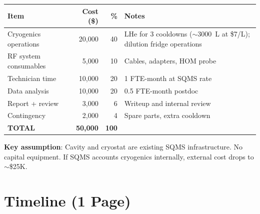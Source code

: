 \documentclass[11pt]{article}
\begin{document}
\begin{center}
\renewcommand{\arraystretch}{1.3}
\begin{tabular}{@{}lrrp{5.5cm}@{}}
\toprule
\textbf{Item} & \textbf{Cost (\$)} & \textbf{\%} &
\textbf{Notes} \\
\midrule
Cryogenics operations & 20,000 & 40 &
  LHe for 3 cooldowns ($\sim$3000~L at \$7/L);
  dilution fridge operations \\
RF system consumables & 5,000 & 10 &
  Cables, adapters, HOM probe \\
Technician time & 10,000 & 20 &
  1 FTE-month at SQMS rate \\
Data analysis & 10,000 & 20 &
  0.5 FTE-month postdoc \\
Report + review & 3,000 & 6 &
  Writeup and internal review \\
Contingency & 2,000 & 4 &
  Spare parts, extra cooldown \\
\midrule
\textbf{TOTAL} & \textbf{50,000} & \textbf{100} & \\
\bottomrule
\end{tabular}
\end{center}

\textbf{Key assumption}: Cavity and cryostat are existing SQMS
infrastructure. No capital equipment. If SQMS accounts cryogenics
internally, external cost drops to $\sim$\$25K.


\section{Timeline (1 Page)}
\label{sec:timeline}
\end{document}
